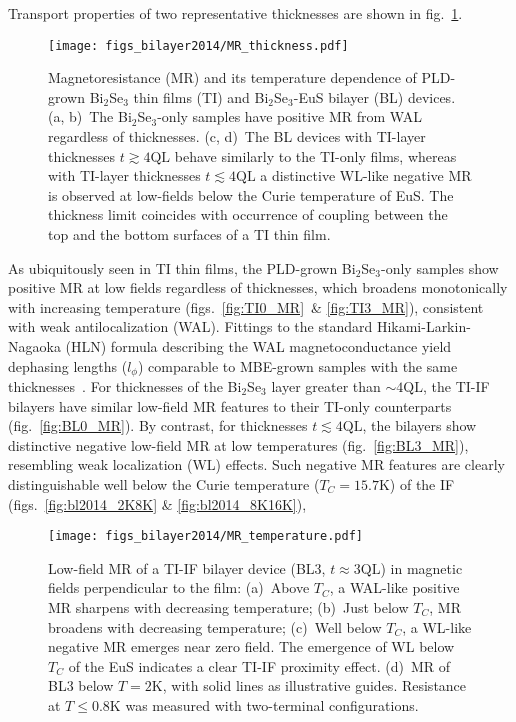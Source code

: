 Transport properties of two representative thicknesses are shown in fig.~\ref{fig:bl2014_MR_thickness}. %
%
\begin{figure}[h]%
\centering%
\subfloat{\label{fig:TI0_MR}}%
\subfloat{\label{fig:TI3_MR}}%
\subfloat{\label{fig:BL0_MR}}%
\subfloat{\label{fig:BL3_MR}}%
\texttt{[image: figs\_bilayer2014/MR\_thickness.pdf]}%
\caption[Magnetoresistance of PLD-grown Bi$_2$Se$_3$ thin films and Bi$_2$Se$_3$ / EuS bilayers]{Magnetoresistance (MR) and its temperature dependence of PLD-grown Bi$_2$Se$_3$ thin films (TI) and Bi$_2$Se$_3$-EuS bilayer (BL) devices. (a, b)~The Bi$_2$Se$_3$-only samples have positive MR from WAL regardless of thicknesses. (c, d)~The BL devices with TI-layer thicknesses $t\gtrsim4\mathrm{QL}$ behave similarly to the TI-only films, whereas with TI-layer thicknesses $t\lesssim4\mathrm{QL}$ a distinctive WL-like negative MR is observed at low-fields below the Curie temperature of EuS. The thickness limit coincides with occurrence of coupling between the top and the bottom surfaces of a TI thin film.}%
\label{fig:bl2014_MR_thickness}%
\end{figure}%
%
As ubiquitously seen in TI thin films, the PLD-grown Bi$_2$Se$_3$-only samples show positive MR at low fields regardless of thicknesses, which broadens monotonically with increasing temperature (figs.~\ref{fig:TI0_MR}~\& \ref{fig:TI3_MR}), consistent with weak antilocalization (WAL). Fittings to the standard Hikami-Larkin-Nagaoka (HLN) formula describing the WAL magnetoconductance\cite{WL_HLN, WL_Khmel, WL_theory} yield dephasing lengths ($l_\phi$) comparable to MBE-grown samples with the same thicknesses~\cite{TI_WAL_thickness, zhangli2013}. For thicknesses of the Bi$_2$Se$_3$ layer greater than $\sim4\mathrm{QL}$, the TI-IF bilayers have similar low-field MR features to their TI-only counterparts (fig.~\ref{fig:BL0_MR}). By contrast, for thicknesses $t\lesssim4\mathrm{QL}$, the bilayers show distinctive negative low-field MR at low temperatures (fig.~\ref{fig:BL3_MR}), resembling weak localization (WL) effects. Such negative MR features are clearly distinguishable well below the Curie temperature ($T_C=15.7$K) of the IF (figs.~\ref{fig:bl2014_2K8K} \& \ref{fig:bl2014_8K16K}), %
%
%
\begin{figure}[h]%
\centering%
\subfloat{\label{fig:bl2014_16K30K}}%
\subfloat{\label{fig:bl2014_8K16K}}%
\subfloat{\label{fig:bl2014_2K8K}}%
\subfloat{\label{fig:bl2014_He3}}%
\texttt{[image: figs\_bilayer2014/MR\_temperature.pdf]}%
\caption[test]{\label{fig:bl2014_MR_temperature}Low-field MR of a TI-IF bilayer device (BL3, $t\approx3\mathrm{QL}$) in magnetic fields perpendicular to the film: (a)~Above $T_C$, a WAL-like positive MR sharpens with decreasing temperature; (b)~Just below $T_C$, MR broadens with decreasing temperature; (c)~Well below $T_C$, a WL-like negative MR emerges near zero field. The emergence of WL below $T_C$ of the EuS indicates a clear TI-IF proximity effect. (d)~MR of BL3 below $T=2$K, with solid lines as illustrative guides. Resistance at $T\leq0.8\mathrm{K}$ was measured with two-terminal configurations.}
\end{figure}%
